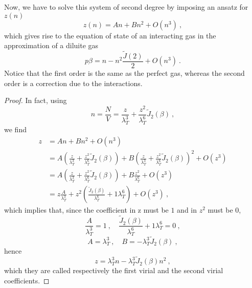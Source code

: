     Now, we have to solve this system of second degree by imposing an ansatz for $z(n)$
    \begin{equation*}
        z (n) = A n + B n^2 + O(n^3) ~,
    \end{equation*}
    which gives rise to the equation of state of an interacting gas in the approximation of a diluite gas
    \begin{equation*}
        p \beta = n - n^2 \frac{\tilde J(2)}{2} + O(n^3) ~.
    \end{equation*}
    Notice that the first order is the same as the perfect gas, whereas the second order is a correction due to the interactions.
    \begin{proof}
        In fact, using 
        \begin{equation*}
            n = \frac{N}{V} = \frac{z}{\lambda_T^3} + \frac{z^2}{\lambda_T^6} \tilde J_2 (\beta) ~,
        \end{equation*}
        we find 
        \begin{equation*}
        \begin{aligned}
            z & = A n + B n^2 + O(n^3) \\ & = A (\frac{z}{\lambda_T^3} + \frac{z^2}{\lambda_T^6} \tilde J_2 (\beta)) + B (\frac{z}{\lambda_T^3} + \frac{z^2}{\lambda_T^6} \tilde J_2 (\beta))^2 + O(z^3) \\ & = A (\frac{z}{\lambda_T^3} + \frac{z^2}{\lambda_T^6} \tilde J_2 (\beta)) + B \frac{z^2}{\lambda_T^6} + O(z^3) \\ & = z \frac{A}{\lambda_T^3} + z^2 ( \frac{\tilde J_2 (\beta)}{\lambda_T^6} + {1}{\lambda_T^6}) + O (z^3) ~,
        \end{aligned}
        \end{equation*}
        which implies that, since the coefficient in z must be $1$ and in $z^2$ must be $0$, 
        \begin{equation*}
            \frac{A}{\lambda_T^3} = 1 ~, \quad \frac{\tilde J_2 (\beta)}{\lambda_T^6} + {1}{\lambda_T^6} = 0 ~,
        \end{equation*}
        \begin{equation*}
            A = \lambda_T^3 ~, \quad B = - \lambda^3_T \tilde J_2(\beta) ~,
        \end{equation*}
        hence 
        \begin{equation*}
            z = \lambda_T^3 n - \lambda^3_T \tilde J_2(\beta) n^2 ~,
        \end{equation*}
        which they are called respectively the first virial and the second virial coefficients.

\end{proof}
